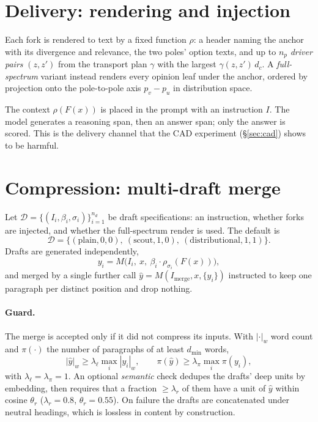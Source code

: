 \documentclass[11pt]{article}
\begin{document}
\section{Delivery: rendering and injection}

Each fork is rendered to text by a fixed function $\rho$: a header naming the
anchor with its divergence and relevance, the two poles' option texts, and up
to $n_p$ \emph{driver pairs} $(z, z')$ from the transport plan $\gamma$ with the
largest $\gamma(z,z')\,d_c$. A \emph{full-spectrum} variant instead renders
every opinion leaf under the anchor, ordered by projection onto the
pole-to-pole axis $p_v - p_u$ in distribution space.

The context $\rho(F(x))$ is placed in the prompt with an instruction $I$. The
model generates a reasoning span, then an answer span; only the answer is
scored. This is the delivery channel that the CAD experiment
(\S\ref{sec:cad}) shows to be harmful.

\section{Compression: multi-draft merge}

\label{sec:merge}
Let $\mathcal{D} = \{(I_i, \beta_i, \sigma_i)\}_{i=1}^{n_d}$ be draft
specifications: an instruction, whether forks are injected, and whether the
full-spectrum render is used. The default is
\[
  \mathcal{D} = \big\{(\text{plain}, 0, 0),\ (\text{scout}, 1, 0),\ (\text{distributional}, 1, 1)\big\}.
\]
Drafts are generated independently,
\[
  y_i = M\big(I_i,\ x,\ \beta_i \cdot \rho_{\sigma_i}(F(x))\big),
\]
and merged by a single further call
$\hat y = M(I_{\mathrm{merge}}, x, \{y_i\})$ instructed to keep one paragraph per
distinct position and drop nothing.

\paragraph{Guard.} The merge is accepted only if it did not compress its
inputs. With $|\cdot|_w$ word count and $\pi(\cdot)$ the number of paragraphs of
at least $d_{\min}$ words,
\[
  |\hat y|_w \ge \lambda_\ell \max_i |y_i|_w,
  \qquad
  \pi(\hat y) \ge \lambda_\pi \max_i \pi(y_i),
\]
with $\lambda_\ell = \lambda_\pi = 1$. An optional \emph{semantic} check
dedupes the drafts' deep units by embedding, then requires that a fraction
$\ge \lambda_r$ of them have a unit of $\hat y$ within cosine $\theta_r$
($\lambda_r = 0.8$, $\theta_r = 0.55$). On failure the drafts are concatenated
under neutral headings, which is lossless in content by construction.
\end{document}
